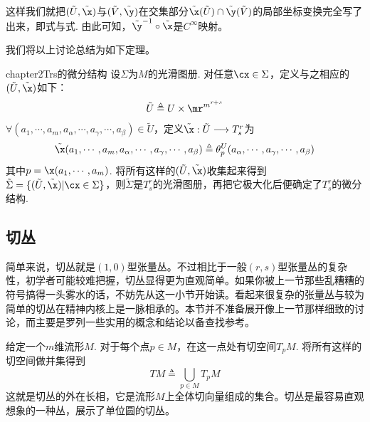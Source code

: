 这样我们就把$(\tilde{  U  },\tilde{  \x  })$与$(\tilde{  V  },\tilde{  \y  })$在交集部分$\tilde{  \x  }(\tilde{  U  })\cap \tilde{  \y  }(\tilde{  V  })$的局部坐标变换完全写了出来，即式与式. 由此可知，$\tilde{  \y  }^{-1}\circ\tilde{  \x  }$是$C^{\infty}$映射。

我们将以上讨论总结为如下定理。

\begin{mythm}{}{chapter2Trs的微分结构}
	设$\Sigma$为$M$的光滑图册. 对任意$\cx\in\Sigma$，定义与之相应的$(\tilde{  U  },\tilde{  \x })$如下：
	\[
	\tilde{  U  }\triangleq U\times \mr^{m^{r+s}}
	\]
	$\forall (a_{1},\cdots,a_{m},a_{\alpha},\cdots,a_{\gamma},\cdots,a_{\beta})\in \tilde{  U  }$，定义$\tilde{ \x  }:\tilde{  U  }\longrightarrow T^{r}_{s}$为
	\[
	\tilde{  \x  }(a_{1},\cdots,a_{m},a_{\alpha},\cdots,a_{\gamma},\cdots,a_{\beta})\triangleq \theta^{U}_{p}(a_{\alpha},\cdots,a_{\gamma},\cdots,a_{\beta})
	\]
	其中$p=\x(a_{1},\cdots,a_{m})$. 将所有这样的$(\tilde{  U  },\tilde{  \x })$收集起来得到$\tilde{  \Sigma  }=\{(\tilde{  U  },\tilde{  \x  }) | \cx\in \Sigma\}$，则$\tilde{  \Sigma  }$是$T^{r}_{s}$的光滑图册，再把它极大化后便确定了$T^{r}_{s}$的微分结构.
\end{mythm}


\subsection{切丛}\label{切丛}

简单来说，切丛就是$(1,0)$型张量丛。不过相比于一般$(r,s)$型张量丛的复杂性，初学者可能较难把握，切丛显得更为直观简单。如果你被上一节那些乱糟糟的符号搞得一头雾水的话，不妨先从这一小节开始读。看起来很复杂的张量丛与较为简单的切丛在精神内核上是一脉相承的。本节并不准备展开像上一节那样细致的讨论，而主要是罗列一些实用的概念和结论以备查找参考。

给定一个$m$维流形$M$. 对于每个点$p\in M$，在这一点处有切空间$T_{p}M$. 将所有这样的切空间做并集得到
\[
TM\triangleq\bigcup_{p\in M}T_{p}M
\]
这就是切丛的外在长相，它是流形$M$上全体切向量组成的集合。切丛是最容易直观想象的一种丛，展示了单位圆的切丛。

